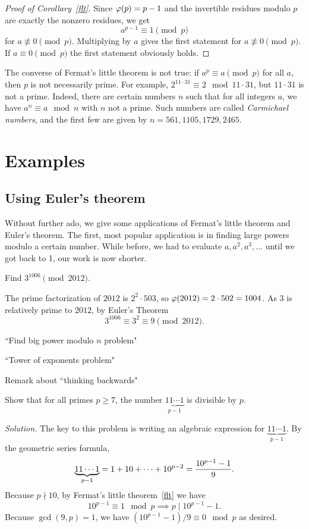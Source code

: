 \begin{proof}[Proof of Corollary~\ref{flt}]
Since $\varphi(p)=p-1$ and the invertible residues modulo $p$ are exactly the nonzero residues, we get
\[
a^{p-1}\equiv 1\pmod{p}
\]
for $a\nequiv 0\pmod{p}$. Multiplying by $a$ gives the first statement for $a\nequiv 0\pmod{p}$. If $a\equiv 0\pmod p$ the first statement obviously holds. 
\end{proof}
\begin{rem}
The converse of Fermat's little theorem is not true: if $a^{p}\equiv a\pmod p$ for all $a$, then $p$ is not necessarily prime.
For example, $2^{11\cdot31}\equiv2\mod{11\cdot31}$, but $11\cdot31$ is not a prime.  Indeed, there are certain numbers $n$ such that for all integers $a$, we have $a^n \equiv a\mod{n}$ with $n$ not a prime.  Such numbers are called {\em Carmichael numbers}, and the first few are given by $n = 561, 1105, 1729, 2465$.\end{rem}
\section{Examples}
\subsection{Using Euler's theorem}
Without further ado, we give some applications of Fermat's little theorem and Euler's theorem. The first, most popular application is in finding large powers modulo a certain number. While before, we had to evaluate $a, a^2, a^3,\ldots $ until we got back to 1, our work is now shorter.
\begin{ex}
Find $3^{1006}\pmod{2012}$.

The prime factorization of $2012$ is $2^2\cdot 503$, so  $\varphi(2012)=2\cdot 502=1004$. As $3$ is relatively prime to $2012$, by Euler's Theorem
\[
3^{1006}\equiv 3^2\equiv 9\pmod{2012}.
\]
\end{ex}

``Find big power modulo $n$ problem"

``Tower of exponents problem"

Remark about ``thinking backwards"

\begin{ex}
Show that for all primes $p \ge 7$, the number $\underbrace{11\cdots1}_{p-1}$ is divisible by $p$.
\end{ex}
{\it Solution.}
The key to this problem is writing an algebraic expression for $\underbrace{11\cdots1}_{p-1}$. By the geometric series formula,
\[\underbrace{11\cdots1}_{p-1} = 1+10+\cdots +10^{p-2}=\frac{10^{p-1}-1}{9}.\]
Because $p\nmid 10$, by Fermat's little theorem~\ref{flt} we have 
\[10^{p-1}\equiv 1\mod{p}\implies p\mid 10^{p-1}-1.\] 
Because $\gcd{(9,p)} = 1$, we have $(10^{p-1}-1)/9\equiv0\mod{p}$ as desired.

